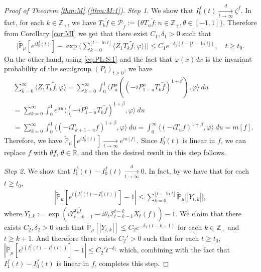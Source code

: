 \documentclass[12pt,a4paper]{amsart}
\theoremstyle{plain}
\theoremstyle{definition}
\numberwithin{equation}{section}
\begin{document}
\begin{proof}[Proof of Theorem \ref{thm:M}.(\ref{thm:M:1})]
  \emph{Step 1.} We show that $I^f_0(t) \xrightarrow[t\to \infty]{d} \zeta^f$.
  In fact, for each $k \in \mathbb Z_+$, we have  $T_{k} \tilde f \in \mathcal P_{\tilde f}:=\{\theta T_n \tilde f: n \in \mathbb Z_+, \theta \in [-1,1]\}$.
    Therefore from Corollary \ref{cor:MI} we get that there exist $C_1,\delta_1 > 0$ such that
  \begin{align}
    \Big|\mathbb{\widetilde{P}}_{\mu} [e^{i I^f_0(t)} ]-\exp\Big(\sum_{k=0}^{\lfloor t-\ln t \rfloor} \langle Z_1T_{k}\tilde f, \varphi\rangle \Big)\Big|
    \leq C_1 e^{-\delta_1(t - \lfloor t - \ln t\rfloor)},
    \quad t\geq t_0.
  \end{align}
  On the other hand, using \eqref{eq:PL:S:1} and the fact that $\varphi(x)dx$ is the invariant probability
  of the semigroup $(P_t)_{t\geq 0}$, we have
  \begin{align}
    \label{eq:PM:CLTS:2}
    & \sum_{k=0}^\infty \langle Z_1 T_{k} \tilde f, \varphi \rangle
    = \sum_{k=0}^\infty \int_0^1 \langle P_u^\alpha ((-iP_{1 - u}^\alpha T_k \tilde f)^{1+\beta}), \varphi\rangle ~du
    \\& = \sum_{k=0}^\infty \int_0^1 e^{\alpha u} \langle  (-iP_{1 - u}^\alpha T_{k}\tilde f)^{1+\beta}, \varphi \rangle ~du
    \\& = \sum_{k=0}^\infty \int_0^1 \langle  (-iT_{k+1 - u} f)^{1+\beta}, \varphi\rangle~du
    = \int_0^\infty \langle  (-iT_{u} f)^{1+\beta}, \varphi\rangle~du = m[f].
  \end{align}
  Therefore, we have $\mathbb{\widetilde{P}}_{\mu} [e^{i I^f_0(t)} ] \xrightarrow[t\to \infty]{} e^{m[f]}$. Since $I_0^f(t)$ is linear in $f$, we can replace $f$ with $\theta f$, $\theta \in \mathbb R$, and then the desired result in this step follows.

  \emph{Step 2.} We show that $I^f_1(t) - I^f_0(t) \xrightarrow[t\to \infty]{d} 0$.
In fact,  by \cite[Lemma 3.4.3]{Durrett2010Probability} we have that for each $t\geq t_0$,
\begin{align}
  \label{eq:PM:S:1}
|\mathbb{\widetilde{P}}_{\mu}[e^{i (I^f_1(t) - I^f_0(t) ) }] - 1|
    \leq \sum_{k=0}^{\lfloor t-\ln t \rfloor}\mathbb{\widetilde{P}}_{\mu}\big[|Y_{t,k}|\big],
\end{align}
where
\(
Y_{t,k}
:= \exp(i \Upsilon_{t-k-1}^{T_{k} \tilde f} - i\theta_t \mathcal I_{t-k-1}^{t-k} X_t(f)) - 1.
\)
We claim that there exists $C_2, \delta_2>0$ such that \(\widetilde {\mathbb P}_\mu [|Y_{t,k}|] \leq C_2 e^{-\delta_2 (t-k-1)}\) for each $k\in \mathbb Z_+$ and $t\geq k+1$.
And therefore there exists $C_2'>0$ such that for each $t \geq t_0$,
$|\mathbb{\widetilde{P}}_{\mu}[e^{i (I^f_1(t)- I^f_0(t))}]-1| \leq C_2't^{-\delta_1}$  which, combining with the fact that $I^f_1(t) - I^f_0(t)$ is linear in $f$, completes this step.


\end{proof}
\end{document}
